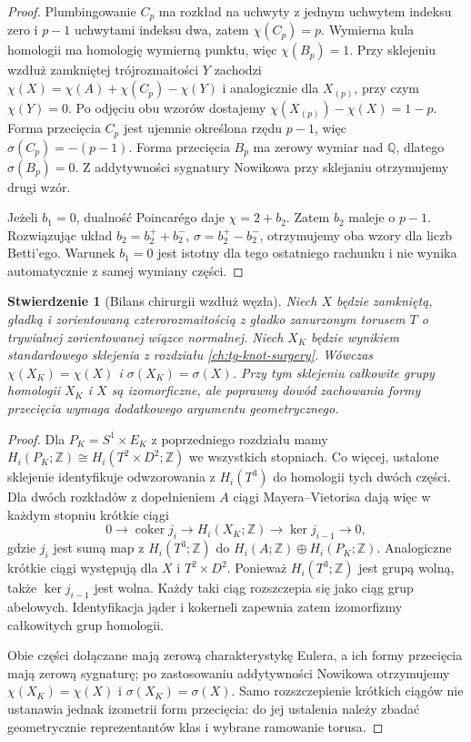 \documentclass[11pt,a4paper]{report}
\numberwithin{equation}{section}
\theoremstyle{plain}
\newtheorem{stwierdzenie}[twierdzenie]{Stwierdzenie}
\theoremstyle{definition}
\theoremstyle{remark}
\begin{document}
\begin{proof}
Plumbingowanie $C_p$ ma rozkład na uchwyty z jednym uchwytem
indeksu zero i $p-1$ uchwytami indeksu dwa,
zatem $\chi(C_p)=p$. Wymierna kula homologii ma
homologię wymierną punktu, więc $\chi(B_p)=1$.
Przy sklejeniu wzdłuż zamkniętej trójrozmaitości $Y$
zachodzi $\chi(X)=\chi(A)+\chi(C_p)-\chi(Y)$ i analogicznie
dla $X_{(p)}$, przy czym $\chi(Y)=0$.
Po odjęciu obu wzorów dostajemy
$\chi(X_{(p)})-\chi(X)=1-p$.
Forma przecięcia $C_p$ jest ujemnie określona rzędu $p-1$,
więc $\sigma(C_p)=-(p-1)$. Forma przecięcia $B_p$
ma zerowy wymiar nad $\mathbb Q$, dlatego $\sigma(B_p)=0$.
Z addytywności sygnatury Nowikowa przy sklejaniu otrzymujemy
drugi wzór.

Jeżeli $b_1=0$, dualność Poincar\'ego daje
$\chi=2+b_2$. Zatem $b_2$ maleje o $p-1$.
Rozwiązując układ $b_2=b_2^++b_2^-$,
$\sigma=b_2^+-b_2^-$, otrzymujemy oba wzory dla liczb
Betti'ego. Warunek $b_1=0$ jest istotny dla tego ostatniego
rachunku i nie wynika automatycznie z samej wymiany części.
\end{proof}

\begin{stwierdzenie}[Bilans chirurgii wzdłuż węzła]
\label{prop:tg-syn-knot}
Niech $X$ będzie zamkniętą, gładką i zorientowaną
czterorozmaitością z gładko zanurzonym torusem $T$
o trywialnej zorientowanej wiązce normalnej.
Niech $X_K$ będzie wynikiem standardowego sklejenia
z rozdziału \ref{ch:tg-knot-surgery}. Wówczas
$\chi(X_K)=\chi(X)$ i $\sigma(X_K)=\sigma(X)$.
Przy tym sklejeniu całkowite grupy homologii $X_K$ i $X$
są izomorficzne, ale poprawny dowód zachowania formy
przecięcia wymaga dodatkowego argumentu geometrycznego.
\end{stwierdzenie}

\begin{proof}
Dla $P_K=S^1\times E_K$ z poprzedniego rozdziału mamy
$H_i(P_K;\mathbb Z)\cong H_i(T^2\times D^2;\mathbb Z)$
we wszystkich stopniach. Co więcej, ustalone sklejenie
identyfikuje odwzorowania z $H_i(T^3)$ do homologii tych dwóch
części. Dla dwóch rozkładów z dopełnieniem $A$ ciągi
Mayera--Vietorisa dają więc w każdym stopniu krótkie ciągi
\[
 0\longrightarrow\operatorname{coker} j_i
 \longrightarrow H_i(X_K;\mathbb Z)
 \longrightarrow\ker j_{i-1}\longrightarrow0,
\]
gdzie $j_i$ jest sumą map z $H_i(T^3;\mathbb Z)$ do
$H_i(A;\mathbb Z)\oplus H_i(P_K;\mathbb Z)$.
Analogiczne krótkie ciągi występują dla $X$ i $T^2\times D^2$.
Ponieważ $H_i(T^3;\mathbb Z)$ jest grupą wolną, także
$\ker j_{i-1}$ jest wolna. Każdy taki ciąg rozszczepia się
jako ciąg grup abelowych. Identyfikacja jąder i kokerneli
zapewnia zatem izomorfizmy całkowitych grup homologii.

Obie części dołączane mają zerową charakterystykę Eulera,
a ich formy przecięcia mają zerową sygnaturę; po
zastosowaniu addytywności Nowikowa otrzymujemy
$\chi(X_K)=\chi(X)$ i $\sigma(X_K)=\sigma(X)$.
Samo rozszczepienie krótkich ciągów nie ustanawia jednak
izometrii form przecięcia: do jej ustalenia należy zbadać
geometrycznie reprezentantów klas i wybrane ramowanie torusa.
\end{proof}
\end{document}
